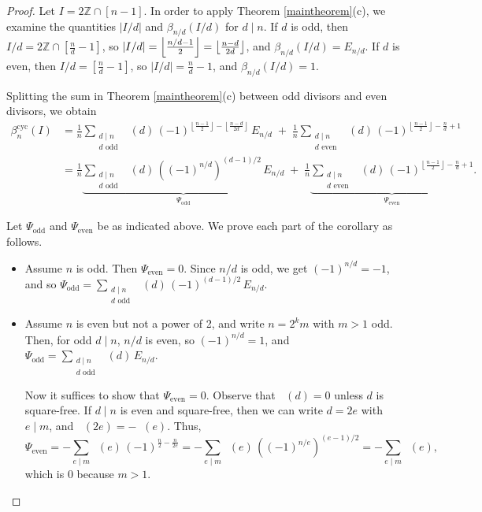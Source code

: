 \documentclass[12pt]{article}
\newcommand{\smallfrac}[2]{\textstyle\frac{#1}{#2}\displaystyle}
\newcommand{\betacyc}{\beta^{\text{cyc}}}
\DeclareMathOperator{\mob}{M\ddot{o}b}
\theoremstyle{definition}
\begin{document}
\begin{proof} Let $I = 2\mathbb{Z} \cap [n-1]$. In order to apply Theorem \ref{maintheorem}(c), we examine the quantities $|I/d|$ and $\beta_{n/d}(I/d)$ for $d\mid n$. If $d$ is odd, then $I/d = 2\mathbb{Z} \cap \left[\smallfrac{n}{d}-1\right]$, so $|I/d| = \left\lfloor\smallfrac{n/d-1}{2}\right\rfloor = \left\lfloor\smallfrac{n-d}{2d}\right\rfloor$, and $\beta_{n/d}(I/d) = E_{n/d}$. If $d$ is even, then $I/d = \left[\smallfrac{n}{d}-1\right]$, so $|I/d| = \smallfrac{n}{d}-1$, and $\beta_{n/d}(I/d) = 1$. 

Splitting the sum in Theorem \ref{maintheorem}(c) between odd divisors and even divisors, we obtain
\begin{align*}
\betacyc_n(I) &= \frac{1}{n} \sum_{\substack{\text{$d\mid n$}\\\text{$d$ odd}}} \mob(d)\,(-1)^{\left\lfloor \frac{n-1}{2}\right\rfloor - \left\lfloor \frac{n-d}{2d}\right\rfloor}\,E_{n/d} \;+\; \frac{1}{n}\sum_{\substack{\text{$d\mid n$}\\\text{$d$ even}}} \mob(d)\,(-1)^{\left\lfloor\frac{n-1}{2}\right\rfloor-\frac{n}{d}+1} \\
&= \frac{1}{n} \underbrace{\sum_{\substack{\text{$d\mid n$}\\\text{$d$ odd}}} \mob(d)\,\left((-1)^{n/d}\right)^{(d-1)/2}\,E_{n/d}}_{\Psi_\text{odd}} \;+\; \frac{1}{n}\underbrace{\sum_{\substack{\text{$d\mid n$}\\\text{$d$ even}}} \mob(d)\,(-1)^{\left\lfloor\frac{n-1}{2}\right\rfloor-\frac{n}{d}+1}}_{\Psi_\text{even}}.
\end{align*}

Let $\Psi_\text{odd}$ and $\Psi_\text{even}$ be as indicated above. We prove each part of the corollary as follows.
\begin{itemize}
\item Assume $n$ is odd. Then $\Psi_\text{even} = 0$. Since $n/d$ is odd, we get $(-1)^{n/d} = -1$, and so $\Psi_\text{odd} = \sum_{\substack{\text{$d\mid n$}\\\text{$d$ odd}}} \mob(d)\,(-1)^{(d-1)/2}\,E_{n/d}$.

\item Assume $n$ is even but not a power of 2, and write $n = 2^k m$ with $m > 1$ odd. Then, for odd $d \mid n$, $n/d$ is even, so $(-1)^{n/d} = 1$, and $\Psi_\text{odd} = \sum_{\substack{\text{$d\mid n$}\\\text{$d$ odd}}} \mob(d)\,E_{n/d}$. 

Now it suffices to show that $\Psi_\text{even} = 0$.
Observe that $\mob(d) = 0$ unless $d$ is square-free. If $d \mid n$ is even and square-free, then we can write $d = 2e$ with $e \mid m$, and $\mob(2e) = -\mob(e)$. Thus,
$$\Psi_\text{even} = -\sum_{\text{$e \mid m$}} \mob(e)\,(-1)^{\frac{n}{2} - \frac{n}{2e}} = -\sum_{\text{$e \mid m$}} \mob(e)\,\left((-1)^{n/e}\right)^{(e-1)/2} = -\sum_{\text{$e \mid m$}} \mob(e),$$
which is $0$ because $m > 1$.


\end{itemize}
\end{proof}
\end{document}
